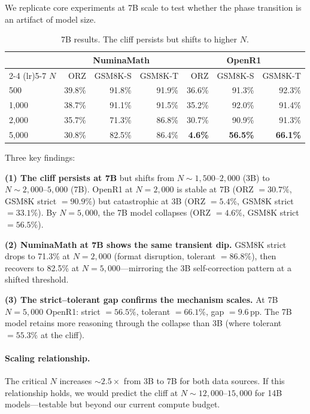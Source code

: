\documentclass{article}
\begin{document}
We replicate core experiments at 7B scale to test whether the phase transition is an artifact of model size.

\begin{table}[h]
\centering
\caption{7B results. The cliff persists but shifts to higher $N$.}
\label{tab:7b}
\small
\begin{tabular}{@{}lrrrrrr@{}}
\toprule
& \multicolumn{3}{c}{NuminaMath} & \multicolumn{3}{c}{OpenR1} \\
\cmidrule(lr){2-4} \cmidrule(lr){5-7}
$N$ & ORZ & GSM8K-S & GSM8K-T & ORZ & GSM8K-S & GSM8K-T \\
\midrule
500 & 39.8\% & 91.8\% & 91.9\% & 36.6\% & 91.3\% & 92.3\% \\
1,000 & 38.7\% & 91.1\% & 91.5\% & 35.2\% & 92.0\% & 91.4\% \\
2,000 & 35.7\% & 71.3\% & 86.8\% & 30.7\% & 90.9\% & 91.3\% \\
5,000 & 30.8\% & 82.5\% & 86.4\% & \textbf{4.6\%} & \textbf{56.5\%} & \textbf{66.1\%} \\
\bottomrule
\end{tabular}
\end{table}

Three key findings:

\textbf{(1) The cliff persists at 7B} but shifts from $N{\sim}1{,}500$--$2{,}000$ (3B) to $N{\sim}2{,}000$--$5{,}000$ (7B). OpenR1 at $N{=}2{,}000$ is stable at 7B (ORZ $= 30.7\%$, GSM8K strict $= 90.9\%$) but catastrophic at 3B (ORZ $= 5.4\%$, GSM8K strict $= 33.1\%$). By $N{=}5{,}000$, the 7B model collapses (ORZ $= 4.6\%$, GSM8K strict $= 56.5\%$).

\textbf{(2) NuminaMath at 7B shows the same transient dip.} GSM8K strict drops to 71.3\% at $N{=}2{,}000$ (format disruption, tolerant $= 86.8\%$), then recovers to 82.5\% at $N{=}5{,}000$---mirroring the 3B self-correction pattern at a shifted threshold.

\textbf{(3) The strict--tolerant gap confirms the mechanism scales.} At 7B $N{=}5{,}000$ OpenR1: strict $= 56.5\%$, tolerant $= 66.1\%$, gap $= 9.6$\,pp. The 7B model retains more reasoning through the collapse than 3B (where tolerant $= 55.3\%$ at the cliff).

\paragraph{Scaling relationship.} The critical $N$ increases ${\sim}2.5{\times}$ from 3B to 7B for both data sources. If this relationship holds, we would predict the cliff at $N{\sim}12{,}000$--$15{,}000$ for 14B models---testable but beyond our current compute budget.
\end{document}
